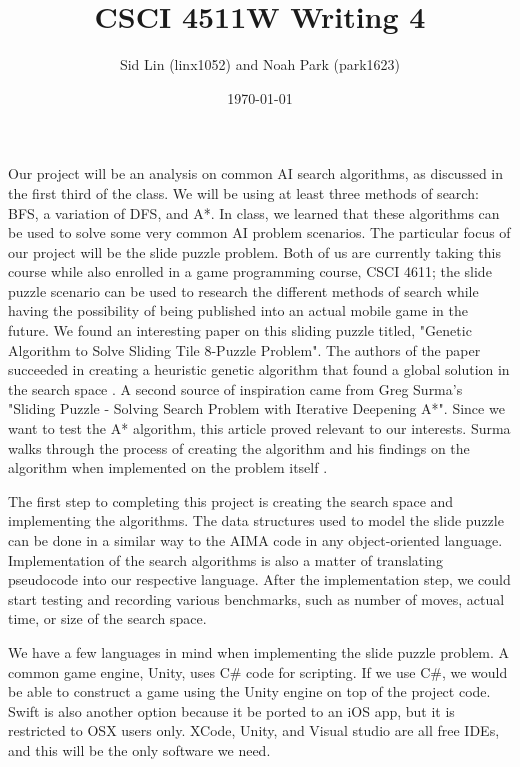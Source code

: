 \documentclass{article}
\title{CSCI 4511W Writing 4}
\date{\today}
\author{Sid Lin (linx1052) and Noah Park (park1623)}
\begin{document}
\maketitle

Our project will be an analysis on common AI search algorithms, as discussed in the first third of the class. We will be using at least three methods of search: BFS, a variation of DFS, and A*. In class, we learned that these algorithms can be used to solve some very common AI problem scenarios. The particular focus of our project will be the slide puzzle problem. Both of us are currently taking this course while also enrolled in a game programming course, CSCI 4611; the slide puzzle scenario can be used to research the different methods of search while having the possibility of being published into an actual mobile game in the future. We found an interesting paper on this sliding puzzle titled, "Genetic Algorithm to Solve Sliding Tile 8-Puzzle Problem". The authors of the paper succeeded in creating a heuristic genetic algorithm that found a global solution in the search space
\citep{article}.
A second source of inspiration came from Greg Surma's "Sliding Puzzle - Solving Search Problem with Iterative Deepening A*". Since we want to test the A* algorithm, this article proved relevant to our interests. Surma walks through the process of creating the algorithm and his findings on the algorithm when implemented on the problem itself
\citep{surma_2019}.
\newline

The first step to completing this project is creating the search space and implementing the algorithms. The data structures used to model the slide puzzle can be done in a similar way to the AIMA code in any object-oriented language. Implementation of the search algorithms is also a matter of translating pseudocode into our respective language. After the implementation step, we could start testing and recording various benchmarks, such as number of moves, actual time, or size of the search space.
\newline

We have a few languages in mind when implementing the slide puzzle problem. A common game engine, Unity, uses C\# code for scripting. If we use C\#, we would be able to construct a game using the Unity engine on top of the project code. Swift is also another option because it be ported to an iOS app, but it is restricted to OSX users only. XCode, Unity, and Visual studio are all free IDEs, and this will be the only software we need.
\newline
\end{document}
